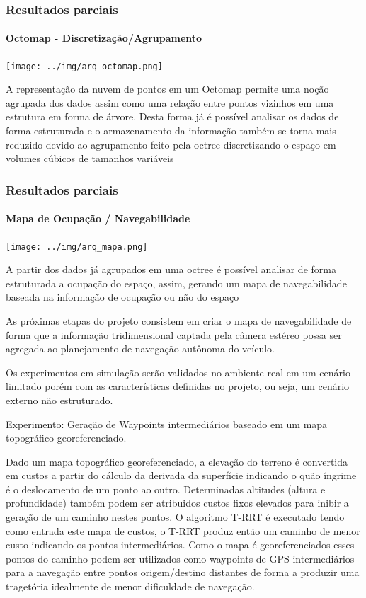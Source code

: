 \documentclass{article}
\begin{document}
\begin{frame}
\frametitle{Resultados parciais}
\framesubtitle{Octomap - Discretização/Agrupamento}
\texttt{[image: ../img/arq\_octomap.png]}
\end{frame}

A representação da nuvem de pontos em um Octomap permite uma noção agrupada
dos dados assim como uma relação entre pontos vizinhos em uma estrutura em
forma de árvore. Desta forma já é possível analisar os dados de forma
estruturada e o armazenamento da informação também se torna mais reduzido devido
ao agrupamento feito pela octree discretizando o espaço em volumes cúbicos de
tamanhos variáveis 


\begin{frame}
\frametitle{Resultados parciais}
\framesubtitle{Mapa de Ocupação / Navegabilidade}
\texttt{[image: ../img/arq\_mapa.png]}
\end{frame}

A partir dos dados já agrupados em uma octree é possível analisar de forma
estruturada a ocupação do espaço, assim, gerando um mapa de navegabilidade
baseada na informação de ocupação ou não do espaço



As próximas etapas do projeto consistem em criar o mapa de navegabilidade de
forma que a informação tridimensional captada pela câmera estéreo possa ser
agregada ao planejamento de navegação autônoma do veículo. 

Os experimentos em simulação serão validados no ambiente real em um cenário
limitado porém com as características definidas no projeto, ou seja, um cenário
externo não estruturado.




Experimento: Geração de Waypoints intermediários baseado em um mapa topográfico
georeferenciado.

Dado um mapa topográfico georeferenciado, a elevação do terreno é convertida em
custos a partir do cálculo da derivada da superfície indicando o quão íngrime é
o deslocamento de um ponto ao outro. Determinadas altitudes (altura e
profundidade) também podem ser atribuidos custos fixos elevados para inibir a
geração de um caminho nestes pontos. O algoritmo T-RRT é executado tendo como
entrada este mapa de custos, o T-RRT produz então um caminho de menor custo
indicando os pontos intermediários. Como o mapa é georeferenciados esses pontos
do caminho podem ser utilizados como waypoints de GPS intermediários para a
navegação entre pontos origem/destino distantes de forma a produzir uma
tragetória idealmente de menor dificuldade de navegação.
\end{document}
